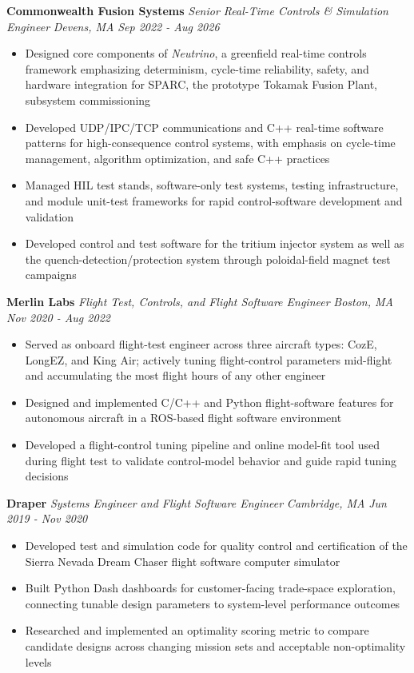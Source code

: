 \documentclass[10pt,letterpaper]{extarticle}
\newcommand{\role}[4]{%
  \textbf{#1} \textbar{} \textit{#3} \hfill {\color{muted}\if\relax\detokenize{#2}\relax\else\textit{#2} \textbar{} \fi\textit{#4}}\par\vspace{-2pt}%
}
\begin{document}
\role{Commonwealth Fusion Systems}{Devens, MA}{Senior Real-Time Controls \& Simulation Engineer}{Sep 2022 - Aug 2026}
\begin{itemize}
  \item Designed core components of \textit{Neutrino}, a greenfield real-time controls framework emphasizing determinism, cycle-time reliability, safety, and hardware integration for SPARC, the prototype Tokamak Fusion Plant, subsystem commissioning
  \item Developed UDP/IPC/TCP communications and C++ real-time software patterns for high-consequence control systems, with emphasis on cycle-time management, algorithm optimization, and safe C++ practices
  \item Managed HIL test stands, software-only test systems, testing infrastructure, and module unit-test frameworks for rapid control-software development and validation
  \item Developed control and test software for the tritium injector system as well as the quench-detection/protection system through poloidal-field magnet test campaigns
\end{itemize}

\role{Merlin Labs}{Boston, MA}{Flight Test, Controls, and Flight Software Engineer}{Nov 2020 - Aug 2022}
\begin{itemize}
  \item Served as onboard flight-test engineer across three aircraft types: CozE, LongEZ, and King Air; actively tuning flight-control parameters mid-flight and accumulating the most flight hours of any other engineer
  \item Designed and implemented C/C++ and Python flight-software features for autonomous aircraft in a ROS-based flight software environment
  \item Developed a flight-control tuning pipeline and online model-fit tool used during flight test to validate control-model behavior and guide rapid tuning decisions
\end{itemize}

\role{Draper}{Cambridge, MA}{Systems Engineer and Flight Software Engineer}{Jun 2019 - Nov 2020}
\begin{itemize}
  \item Developed test and simulation code for quality control and certification of the Sierra Nevada Dream Chaser flight software computer simulator
  \item Built Python Dash dashboards for customer-facing trade-space exploration, connecting tunable design parameters to system-level performance outcomes
  \item Researched and implemented an optimality scoring metric to compare candidate designs across changing mission sets and acceptable non-optimality levels
\end{itemize}
\end{document}
